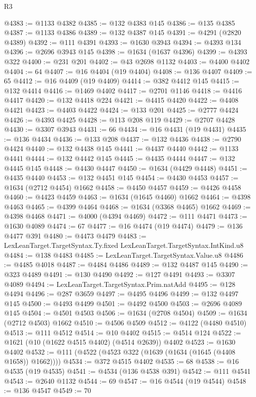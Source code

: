 \begin{lexlean}{R3}
\begin{coremodule}
@4383 := @1133 @4382
@4385 := @132 @4383 @145
@4386 := @135 @4385
@4387 := @1133 @4386
@4389 := @132 @4387 @145
@4391 := @4291 (@2820 @4389)
@4392 := @111 @4391
@4393 := @1630 @3943
@4394 := @4393 @134
@4396 := @2696 @3943 @145
@4398 := @1634 (@1637 @4396)
@4399 := @4393 @322
@4400 := @231 @201
@4402 := @43 @2698 @1132
@4403 := @4400 @4402
@4404 := 64
@4407 := @16 @4404 (@19 @4404)
@4408 := @136 @4407
@4409 := 65
@4412 := @16 @4409 (@19 @4409)
@4414 := @382 @4412 @145
@4415 := @132 @4414
@4416 := @1469 @4402
@4417 := @2701 @1146
@4418 := @4416 @4417
@4420 := @132 @4418 @224
@4421 := @4415 @4420
@4422 := @4408 @4421
@4423 := @4403 @4422
@4424 := @133 @201
@4425 := @2777 @4424
@4426 := @4393 @4425
@4428 := @113 @208 @119
@4429 := @2707 @4428
@4430 := @3307 @3943
@4431 := 66
@4434 := @16 @4431 (@19 @4431)
@4435 := @136 @4434
@4436 := @133 @208
@4437 := @132 @4436
@4438 := @2790 @4424
@4440 := @132 @4438 @145
@4441 := @4437 @4440
@4442 := @1133 @4441
@4444 := @132 @4442 @145
@4445 := @4435 @4444
@4447 := @132 @4445 @145
@4448 := @4430 @4447
@4450 := @1634 (@4429 @4448)
@4451 := @4435 @4440
@4453 := @132 @4451 @145
@4454 := @4430 @4453
@4457 := @1634 (@2712 @4454) @1662
@4458 := @4450 @4457
@4459 := @4426 @4458
@4460 := @4423 @4459
@4463 := @1634 (@1645 @4460) @1662
@4464 := @4398 @4463
@4465 := @4399 @4464
@4468 := @1634 (@3368 @4465) @1662
@4469 := @4398 @4468
@4471 := @4000 (@4394 @4469)
@4472 := @111 @4471
@4473 := @1630 @4089
@4474 := 67
@4477 := @16 @4474 (@19 @4474)
@4479 := @136 @4477 @391
@4480 := @4473 @4479
@4483 := LexLeanTarget.TargetSyntax.Ty.fixed LexLeanTarget.TargetSyntax.IntKind.u8
@4484 := @138 @4483
@4485 := LexLeanTarget.TargetSyntax.Value.u8
@4486 := @4485 @4018
@4487 := @4484 @4486
@4489 := @132 @4487 @145
@4490 := @323 @4489
@4491 := @130 @4490
@4492 := @127 @4491
@4493 := @3307 @4089
@4494 := LexLeanTarget.TargetSyntax.Prim.natAdd
@4495 := @128 @4494
@4496 := @287 @3659
@4497 := @4495 @4496
@4499 := @132 @4497 @145
@4500 := @4493 @4499
@4501 := @4492 @4500
@4503 := @2696 @4089 @145
@4504 := @4501 @4503
@4506 := @1634 (@2708 @4504)
@4509 := @1634 (@2712 @4503) @1662
@4510 := @4506 @4509
@4512 := @4122 (@4480 @4510)
@4513 := @111 @4512
@4514 := @10 @4402
@4515 := @4514 @124
@4522 := @1621 (@10 (@1622 @4515 @4402) (@4514 @2639)) @4402
@4523 := @1630 @4402
@4532 := @111 (@4522 (@4523 @322 (@1639 (@1634 (@1645 (@4408 @1658)) @1662))))
@4534 := @372 @4515 @4402
@4535 := 68
@4538 := @16 @4535 (@19 @4535)
@4541 := @4534 (@136 @4538 @391)
@4542 := @111 @4541
@4543 := @2640 @1132
@4544 := 69
@4547 := @16 @4544 (@19 @4544)
@4548 := @136 @4547
@4549 := 70

\end{coremodule}
\end{lexlean}
